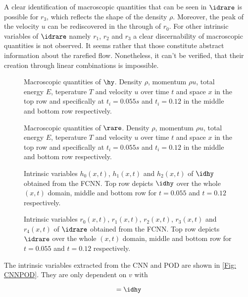 A clear identification of macroscopic quantities that can be seen in \(\idrare\) is possible for \(r_3\), which reflects the shape of the density \(\rho\). Moreover, the peak of the velocity \(u\) can be rediscovered in the through of \(r_0\). For other intrinsic variables of \(\idrare\) namely \(r_1\), \(r_2\) and \(r_3\) a clear discernability of macroscopic quantities is not observed. It seems rather that those constitute abstract information about the rarefied flow. Nonetheless, it can't be verified, that their creation through linear combinations is impossible.
\clearpage
\begin{figure}[htp!]
	
	\caption{Macroscopic quantities of \(\hy\). Density \(\rho\), momentum \(\rho u\), total energy \(E\), teperature \(T\) and velocity \(u\) over time \(t\) and space \(x\) in the top row and specifically at \(t_i=0.055s\) and \(t_i=0.12\) in the middle and bottom row respectively.}
	\label{Fig: Macro_hy}
\end{figure}
\begin{figure}[hbp!]
	
		\caption{Macroscopic quantities of \(\rare\). Density \(\rho\), momentum \(\rho u\), total energy \(E\), teperature \(T\) and velocity \(u\) over time \(t\) and space \(x\) in the top row and specifically at \(t_i=0.055s\) and \(t_i=0.12\) in the middle and bottom row respectively.}
	\label{Fig: Macro_rare}
\end{figure}
\clearpage
\begin{figure}[htp!]
	\centering
	
	\caption{Intrinsic variables \(h_0(x,t)\), \(h_1(x,t)\) and \(h_2(x,t)\) of \(\idhy\) obtained from the FCNN. Top row depicts \(\idhy\) over the whole \((x,t)\) domain, middle and bottom row for \(t=0.055\) and \(t=0.12\) respectively.}
	\label{Fig: Code_hy}
\end{figure}
\begin{figure}[hbp!]
	
	\caption{Intrinsic variables \(r_0(x,t)\), \(r_1(x,t)\), \(r_2(x,t)\), \(r_3(x,t)\) and \(r_4(x,t)\) of \(\idrare\) obtained from the FCNN. Top row depicts \(\idrare\) over the whole \((x,t)\) domain, middle and bottom row for \(t=0.055\) and \(t=0.12\) respectively.}
	\label{Fig: Code_rare}
\end{figure}
\clearpage
The intrinsic variables extracted from the CNN and POD are shown in \cref{Fig: CNNPOD}. They are only dependent on \(v\) with\\
\begin{minipage}{0.45\textwidth}
	\begin{equation}
	[h_1(v),\dots,h_p(v)] = \idhy
	\end{equation}
\end{minipage}%
